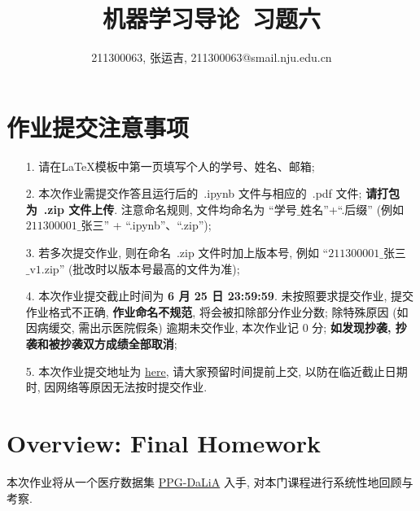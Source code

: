 \documentclass[a4paper,UTF8]{article}
\numberwithin{equation}{section}
\numberwithin{equation}{section}
\theoremstyle{definition}
\begin{document}
\title{机器学习导论\ 习题六}
\author{211300063, 张运吉, 211300063@smail.nju.edu.cn}
\maketitle
\section*{作业提交注意事项}
\begin{tcolorbox}
	\begin{enumerate}
		\item[1.] 请在LaTeX模板中第一页填写个人的学号、姓名、邮箱;
		\item[2.] 本次作业需提交作答且运行后的~.ipynb 文件与相应的~.pdf 文件; {\color{red}\textbf{请打包为~.zip 文件上传}}. 注意命名规则, 文件均命名为 “$\text{学号}\_\text{姓名}$”+“.后缀” (例如 $\text{211300001}\_\text{张三}$” + “.ipynb”、“.zip”);
		\item[3.] 若多次提交作业, 则在命名~.zip 文件时加上版本号, 例如 “$\text{211300001}\_\text{张三}$ $\_\text{v1.zip}$” (批改时以版本号最高的文件为准);
		\item[4.] 本次作业提交截止时间为 {\color{red}\textbf{ 6 月 25 日 23:59:59}}. 未按照要求提交作业, 提交作业格式不正确, {\color{red}\textbf{作业命名不规范}}, 将会被扣除部分作业分数; 除特殊原因 (如因病缓交, 需出示医院假条) 逾期未交作业, 本次作业记 0 分; {\color{red}\textbf{如发现抄袭, 抄袭和被抄袭双方成绩全部取消}};
		\item[5.] 本次作业提交地址为 \href{https://box.nju.edu.cn/u/d/c03d48964e324ba28f6a/}{here}, 请大家预留时间提前上交, 以防在临近截止日期时, 因网络等原因无法按时提交作业.
	\end{enumerate}
\end{tcolorbox}
\newpage


\section*{Overview: Final Homework}

本次作业将从一个医疗数据集 \href{https://archive.ics.uci.edu/ml/datasets/PPG-DaLiA}{PPG-DaLiA} 入手, 对本门课程进行系统性地回顾与考察.
\end{document}

